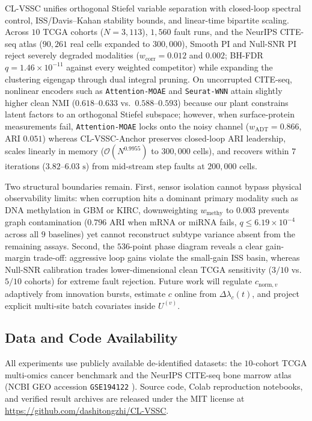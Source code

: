 \documentclass[journal]{IEEEtran}
\begin{document}
CL-VSSC unifies orthogonal Stiefel variable separation with closed-loop spectral control, ISS/Davis--Kahan stability bounds, and linear-time bipartite scaling. Across $10$ TCGA cohorts ($N=3{,}113$), $1{,}560$ fault runs, and the NeurIPS CITE-seq atlas ($90{,}261$ real cells expanded to $300{,}000$), Smooth PI and Null-SNR PI reject severely degraded modalities ($w_{\mathrm{corr}} = 0.012$ and $0.002$; BH-FDR $q = 1.46\times 10^{-11}$ against every weighted competitor) while expanding the clustering eigengap through dual integral pruning. On uncorrupted CITE-seq, nonlinear encoders such as \texttt{Attention-\allowbreak MOAE} and \texttt{Seurat-\allowbreak WNN} attain slightly higher clean NMI ($0.618\text{--}0.633$ vs.\ $0.588\text{--}0.593$) because our plant constrains latent factors to an orthogonal Stiefel subspace; however, when surface-protein measurements fail, \texttt{Attention-\allowbreak MOAE} locks onto the noisy channel ($w_{\mathrm{ADT}}=0.866$, ARI $0.051$) whereas CL-VSSC-Anchor preserves closed-loop ARI leadership, scales linearly in memory ($\mathcal{O}(N^{0.9955})$ to $300{,}000$ cells), and recovers within $7$ iterations ($3.82\text{--}6.03\text{ s}$) from mid-stream step faults at $200{,}000$ cells.

Two structural boundaries remain. First, sensor isolation cannot bypass physical observability limits: when corruption hits a dominant primary modality such as DNA methylation in GBM or KIRC, downweighting $w_{\mathrm{methy}}$ to $0.003$ prevents graph contamination ($0.796$ ARI when mRNA or miRNA fails, $q \le 6.19\times 10^{-4}$ across all $9$ baselines) yet cannot reconstruct subtype variance absent from the remaining assays. Second, the $536$-point phase diagram reveals a clear gain-margin trade-off: aggressive loop gains violate the small-gain ISS basin, whereas Null-SNR calibration trades lower-dimensional clean TCGA sensitivity ($3/10$ vs.\ $5/10$ cohorts) for extreme fault rejection. Future work will regulate $c_{\mathrm{norm},v}$ adaptively from innovation bursts, estimate $c$ online from $\Delta\lambda_c(t)$, and project explicit multi-site batch covariates inside $U^{(v)}$.

\subsection*{Data and Code Availability}
All experiments use publicly available de-identified datasets: the $10$-cohort TCGA multi-omics cancer benchmark \cite{rappoport2018multi} and the NeurIPS CITE-seq bone marrow atlas (NCBI GEO accession \texttt{GSE194122} \cite{luecken2021sandbox}). Source code, Colab reproduction notebooks, and verified result archives are released under the MIT license at \url{https://github.com/dashitongzhi/CL-VSSC}.
\end{document}
